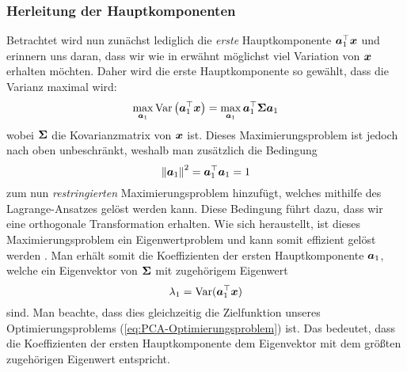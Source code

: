 \subsubsection{Herleitung der Hauptkomponenten}
\label{ch:MethodenDerDimRed:statistisch:PCA:HerleitungPC}
Betrachtet wird nun zunächst lediglich die \textit{erste} Hauptkomponente $\bm{a}_1^\top \bm{x}$ und erinnern uns daran, dass wir wie in  erwähnt möglichst viel Variation von $\bm{x}$ erhalten möchten. Daher wird die erste Hauptkomponente so gewählt, dass die Varianz maximal wird:
\begin{equation}
	\label{eq:PCA-Optimierungsproblem}
	\max_{\bm{a}_1} \operatorname{Var} \left( \bm{a}_1^\top \bm{x} \right) = \max_{\bm{a}_1} \bm{a}_1^\top \mathbf{\Sigma} \bm{a}_1
\end{equation}
wobei $\mathbf{\Sigma}$ die Kovarianzmatrix von $\bm{x}$ ist. Dieses Maximierungsproblem ist jedoch nach oben unbeschränkt, weshalb man zusätzlich die Bedingung
\begin{equation}
	\left\lVert \bm{a}_1 \right\rVert^2 = \bm{a}_1^\top \bm{a}_1 = 1
\end{equation}
zum nun \textit{restringierten} Maximierungsproblem hinzufügt, welches mithilfe des Lagrange-Ansatzes gelöst werden kann. Diese Bedingung führt dazu, dass wir eine orthogonale Transformation erhalten. Wie sich heraustellt, ist dieses Maximierungsproblem ein Eigenwertproblem und kann somit effizient gelöst werden \parencite[vgl.][4 -- 6]{Jolliffe.2002}. Man erhält somit die Koeffizienten
der ersten Hauptkomponente $\bm{a}_1$, welche ein Eigenvektor von $\mathbf{\Sigma}$ mit zugehörigem
Eigenwert
\begin{equation}
	\lambda_1 = \operatorname{Var}(\bm{a}_1^\top \bm{x})
\end{equation}
sind. Man beachte, dass dies gleichzeitig die Zielfunktion unseres Optimierungsproblems (\eqref{eq:PCA-Optimierungsproblem}) ist. Das bedeutet, dass die Koeffizienten der ersten Hauptkomponente dem Eigenvektor mit dem größten zugehörigen Eigenwert entspricht.

